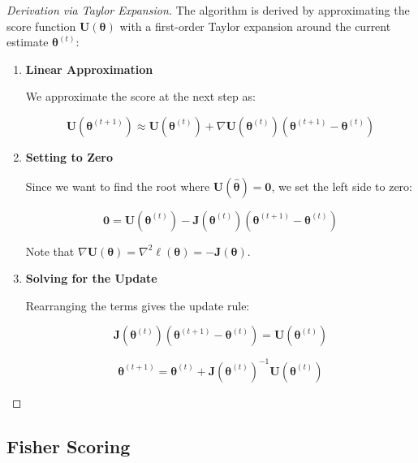 \documentclass[
  letterpaper,
  DIV=11,
  numbers=noendperiod]{scrreprt}
\renewcommand{\[}{\begin{equation}}
\renewcommand{\]}{\end{equation}}
\theoremstyle{definition}
\theoremstyle{plain}
\theoremstyle{plain}
\theoremstyle{plain}
\theoremstyle{definition}
\theoremstyle{plain}
\theoremstyle{remark}
\begin{document}
\begin{proof}[Derivation via Taylor Expansion]
The algorithm is derived by approximating the score function
\(\mathbf{U}(\boldsymbol{\theta})\) with a first-order Taylor expansion
around the current estimate \(\boldsymbol{\theta}^{(t)}\):

\begin{enumerate}
\def\labelenumi{\arabic{enumi}.}
\item
  \textbf{Linear Approximation}

  We approximate the score at the next step as:

  \[
  \mathbf{U}(\boldsymbol{\theta}^{(t+1)}) \approx \mathbf{U}(\boldsymbol{\theta}^{(t)}) + \nabla \mathbf{U}(\boldsymbol{\theta}^{(t)}) (\boldsymbol{\theta}^{(t+1)} - \boldsymbol{\theta}^{(t)})
  \]
\item
  \textbf{Setting to Zero}

  Since we want to find the root where
  \(\mathbf{U}(\hat{\boldsymbol{\theta}}) = \mathbf{0}\), we set the
  left side to zero:

  \[
  \mathbf{0} = \mathbf{U}(\boldsymbol{\theta}^{(t)}) - \mathbf{J}(\boldsymbol{\theta}^{(t)}) (\boldsymbol{\theta}^{(t+1)} - \boldsymbol{\theta}^{(t)})
  \]

  Note that
  \(\nabla \mathbf{U}(\boldsymbol{\theta}) = \nabla^2 \ell(\boldsymbol{\theta}) = -\mathbf{J}(\boldsymbol{\theta})\).
\item
  \textbf{Solving for the Update}

  Rearranging the terms gives the update rule:

  \[
  \mathbf{J}(\boldsymbol{\theta}^{(t)}) (\boldsymbol{\theta}^{(t+1)} - \boldsymbol{\theta}^{(t)}) = \mathbf{U}(\boldsymbol{\theta}^{(t)})
  \]

  \[
  \boldsymbol{\theta}^{(t+1)} = \boldsymbol{\theta}^{(t)} + \mathbf{J}(\boldsymbol{\theta}^{(t)})^{-1} \mathbf{U}(\boldsymbol{\theta}^{(t)})
  \]
\end{enumerate}

\end{proof}

\subsection{Fisher Scoring}\label{fisher-scoring}
\end{document}
